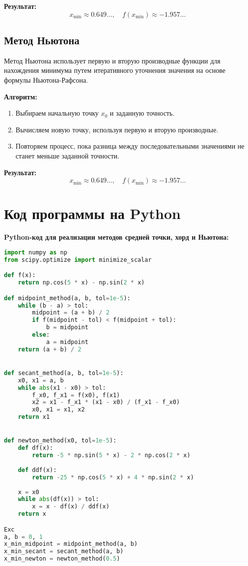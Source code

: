 \documentclass[a4paper,12pt]{article}
\begin{document}
\textbf{Результат:}
\[ x_{\text{min}} \approx 0.649 \ldots, \quad f(x_{\text{min}}) \approx -1.957 \ldots \]

\subsection{Метод Ньютона}

Метод Ньютона использует первую и вторую производные функции для нахождения минимума путем итеративного уточнения значения на основе формулы Ньютона-Рафсона.

\textbf{Алгоритм:}
\begin{enumerate}
    \item Выбираем начальную точку \( x_0 \) и заданную точность.
    \item Вычисляем новую точку, используя первую и вторую производные.
    \item Повторяем процесс, пока разница между последовательными значениями не станет меньше заданной точности.
\end{enumerate}

\textbf{Результат:}
\[ x_{\text{min}} \approx 0.649 \ldots, \quad f(x_{\text{min}}) \approx -1.957 \ldots \]

\section{Код программы на Python}

\textbf{Python-код для реализации методов средней точки, хорд и Ньютона:}

\begin{lstlisting}[language=Python]
import numpy as np
from scipy.optimize import minimize_scalar

def f(x):
    return np.cos(5 * x) - np.sin(2 * x)

def midpoint_method(a, b, tol=1e-5):
    while (b - a) > tol:
        midpoint = (a + b) / 2
        if f(midpoint - tol) < f(midpoint + tol):
            b = midpoint
        else:
            a = midpoint
    return (a + b) / 2


def secant_method(a, b, tol=1e-5):
    x0, x1 = a, b
    while abs(x1 - x0) > tol:
        f_x0, f_x1 = f(x0), f(x1)
        x2 = x1 - f_x1 * (x1 - x0) / (f_x1 - f_x0)
        x0, x1 = x1, x2
    return x1


def newton_method(x0, tol=1e-5):
    def df(x):
        return -5 * np.sin(5 * x) - 2 * np.cos(2 * x)
    
    def ddf(x):
        return -25 * np.cos(5 * x) + 4 * np.sin(2 * x)
    
    x = x0
    while abs(df(x)) > tol:
        x = x - df(x) / ddf(x)
    return x

Exc
a, b = 0, 1
x_min_midpoint = midpoint_method(a, b)
x_min_secant = secant_method(a, b)
x_min_newton = newton_method(0.5)

\end{lstlisting}
\end{document}
